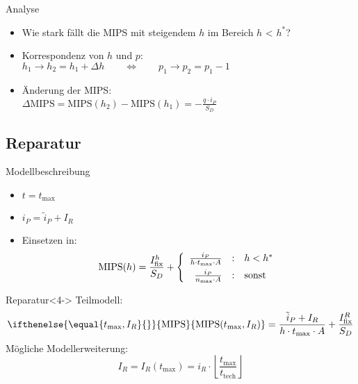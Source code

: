 \documentclass[beamer, xcolor=table]{beamer}
\newcommand{\MIPS}[1][]{
  \ifthenelse {\equal {#1} {}}
  {\text{MIPS}} %
  {\text{MIPS}({#1})} %
}
\newcommand{\I}[1]{I_\text{#1}}
\renewcommand{\t}[1]{t_\text{#1}}
\begin{document}
	\begin{frame}{Analyse}		
		\begin{itemize}
			\item<1-> Wie stark fällt die MIPS mit steigendem $h$ im Bereich $h$ < $h^*$?
			\item<2-> Korrespondenz von $h$ und $p$: \\ $h_1 \rightarrow h_2 = h_1 + \Delta h \qquad \Leftrightarrow \qquad p_1 \rightarrow p_2 = p_1 -1$
			\item<3-> Änderung der MIPS: \\ $\Delta \text{MIPS} = \text{MIPS}(h_2) - \text{MIPS}(h_1) = - \frac{q \cdot i_P}{S_D}$
		\end{itemize}
		\begin{center}
			\resizebox{0.5\linewidth}{!}{
				
			}
		\end{center}
	\end{frame}

\subsection{Reparatur}
\frame{\subsectionpage}
	\begin{frame}{Modellbeschreibung}
        \begin{itemize}
            \item<1-> $t = \t{max}$
            \item<2-> $i_P = \tilde{i}_P + I_R$
            \item<3-> Einsetzen in: 
                    \begin{equation*} 
                        \text{MIPS}(h) =
                        \frac{I_{\text{fix}}^h}{S_D} + \left\{ 
                            \begin{array}{r@{\quad : \quad}l}
                                \frac{i_P}{h \cdot t_{\text{max}} \cdot A}&
                                h < h^*  \\[5pt]
                                \frac{i_P}{n_{\text{max}} \cdot A}&  \text{sonst}
                            \end{array} 
                        \right.
                    \end{equation*}
        \end{itemize}
		\begin{center}
            \begin{block}{Reparatur}<4->
                Teilmodell:
                \begin{equation*}
                    \MIPS[\t{max}, I_R] = \frac{\tilde{i}_P + I_R}{h\cdot \t{max}\cdot A} 
                    + \frac{\I{fix}^R}{S_D}
                \end{equation*}
                Mögliche Modellerweiterung:
                \begin{equation*}
                    I_R = I_R(\t{max}) = i_R \cdot
                    \left\lfloor\frac{\t{max}}{\t{tech}}\right\rfloor
                \end{equation*}
            \end{block}
		\end{center}
	\end{frame}
\end{document}
